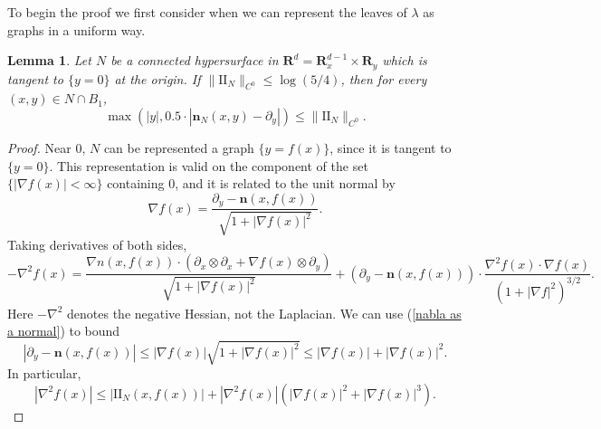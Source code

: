 \documentclass[reqno,11pt]{amsart}
\newcommand{\RR}{\mathbf{R}}
\newcommand{\Two}{\mathrm{I\!I}}
\newcommand{\normal}{\mathbf n}
\newtheorem{lemma}[theorem]{Lemma}
\theoremstyle{definition}
\numberwithin{equation}{section}
\begin{document}
To begin the proof we first consider when we can represent the leaves of $\lambda$ as graphs in a uniform way.

\begin{lemma}\label{existence of tubes}
	Let $N$ be a connected hypersurface in $\RR^d = \RR^{d - 1}_x \times \RR_y$ which is tangent to $\{y = 0\}$ at the origin.
	If $\|\Two_N\|_{C^0} \leq \log(5/4)$, then for every $(x, y) \in N \cap B_1$,
	$$\max(|y|, 0.5 \cdot |\normal_N(x, y) - \partial_y|) \leq \|\Two_N\|_{C^0}.$$
\end{lemma}
\begin{proof}
	Near $0$, $N$ can be represented a graph $\{y = f(x)\}$, since it is tangent to $\{y = 0\}$.
	This representation is valid on the component of the set $\{|\nabla f(x)| < \infty\}$ containing $0$, and it is related to the unit normal by
\begin{equation}\label{nabla as a normal}
	\nabla f(x) = \frac{\partial_y - \normal(x, f(x))}{\sqrt{1 + |\nabla f(x)|^2}}.
\end{equation}
	Taking derivatives of both sides,
	$$-\nabla^2 f(x) = \frac{\nabla n(x, f(x)) \cdot (\partial_x \otimes \partial_x + \nabla f(x) \otimes \partial_y)}{\sqrt{1 + |\nabla f(x)|^2}} + (\partial_y - \normal(x, f(x))) \cdot \frac{\nabla^2 f(x) \cdot \nabla f(x)}{(1 + |\nabla f|^2)^{3/2}}.$$
	Here $-\nabla^2$ denotes the negative Hessian, not the Laplacian.
	We can use (\ref{nabla as a normal}) to bound
	$$|\partial_y - \normal(x, f(x))| \leq |\nabla f(x)|\sqrt{1 + |\nabla f(x)|^2} \leq |\nabla f(x)| + |\nabla f(x)|^2.$$
	In particular,
	$$|\nabla^2 f(x)| \leq |\Two_N(x, f(x))| + |\nabla^2 f(x)| (|\nabla f(x)|^2 + |\nabla f(x)|^3).$$


\end{proof}
\end{document}
